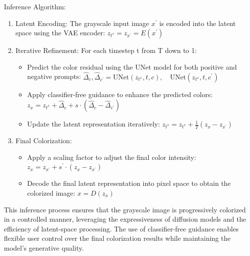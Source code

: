 \documentclass[10pt,twocolumn,letterpaper]{article}
\begin{document}
Inference Algorithm:
\begin{enumerate}
\item Latent Encoding:
The grayscale input image  $x^{\prime} $ is encoded into the latent space using the VAE encoder:
$z_{t^x} = z_{x^{\prime}} = E(x^{\prime})$
\item Iterative Refinement: For each timestep t from T down to 1:
\begin{itemize}
\item Predict the color residual using the UNet model for both positive and negative prompts: \begin{math} \hat{\Delta}_{c}, \hat{\Delta}_{c^{\prime}} = \text{UNet}(z_{t^x}, t, c), \quad \text{UNet}(z_{t^x}, t, c^{\prime}) \end{math}
\item Apply classifier-free guidance to enhance the predicted colors: \begin{math} z_x = z_{t^x }+ \hat{\Delta}_{c} + s \cdot (\hat{\Delta}_{c} - \hat{\Delta}_{c^{\prime}})\end{math} 
\item Update the latent representation iteratively: \begin{math} z_{t^x }= z_{t^x }+ \frac{1}{T} (z_x - z_{x^{\prime}})\end{math} 
\end{itemize}
\item Final Colorization:

\begin{itemize}
\item Apply a scaling factor to adjust the final color intensity: \begin{math} z_x = z_{x^{\prime}} + s^{\prime}\cdot (z_x - z_{x^{\prime}})\end{math} 
\item Decode the final latent representation into pixel space to obtain the colorized image: \begin{math}x = D(z_x)\end{math}
\end{itemize}
\end{enumerate}

This inference process ensures that the grayscale image is progressively colorized in a controlled manner, leveraging the expressiveness of diffusion models and the efficiency of latent-space processing. The use of classifier-free guidance enables flexible user control over the final colorization results while maintaining the model’s generative quality.
\end{document}
